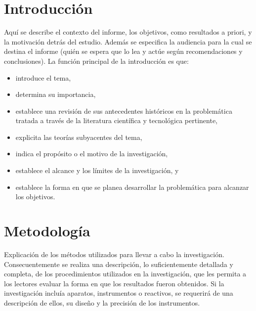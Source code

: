 \documentclass[a4paper,12pt]{article}
\title{\documentTitle}
\author{\authorName \\ \affiliation}
\date{\today}
\begin{document}
\maketitle

\begin{abstract}
Este es el resumen del informe, donde se presenta una visión general del contenido y los principales hallazgos.

\textbf{Keywords:} keyword 1; keyword 2; keyword 3, keyword 4; keyword 5
\end{abstract}

\section{Introducción}
Aquí se describe el contexto del informe, los objetivos, como resultados a priori, y la motivación detrás del estudio.
Además se especifica la audiencia para la cual se destina el informe (quién se espera que lo lea y actúe según recomendaciones y conclusiones).
La función principal de la introducción es que:
\begin{itemize}
\item introduce el tema,
\item determina su importancia,
\item establece una revisión de sus antecedentes históricos en la problemática tratada a través de la literatura científica y tecnológica pertinente,
\item explicita las teorías subyacentes del tema,
\item indica el propósito o el motivo de la investigación,
\item establece el alcance y los límites de la investigación, y
\item establece la forma en que se planea desarrollar la problemática para alcanzar los objetivos.


\end{itemize}

\section{Metodología}
Explicación de los métodos utilizados para llevar a cabo la investigación. Consecuentemente se realiza una descripción, lo suficientemente detallada y completa, de los procedimientos utilizados en la investigación, que les permita a los lectores evaluar la forma en que los resultados fueron obtenidos.
Si la investigación incluía aparatos, instrumentos o reactivos, se requerirá de una descripción de ellos, su diseño y la precisión de los instrumentos.
\end{document}
